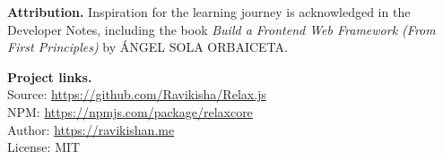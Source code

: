 \vspace{0.8em}
\noindent\textbf{Attribution.} Inspiration for the learning journey is acknowledged in the Developer Notes, including the book \textit{Build a Frontend Web Framework (From First Principles)} by ÁNGEL SOLA ORBAICETA.

\vspace{0.8em}
\noindent\textbf{Project links.}\\
\noindent Source: \href{https://github.com/Ravikisha/Relax.js}{https://github.com/Ravikisha/Relax.js}\\
\noindent NPM: \href{https://npmjs.com/package/relaxcore}{https://npmjs.com/package/relaxcore}\\
\noindent Author: \href{https://ravikishan.me}{https://ravikishan.me}\\
\noindent License: MIT
